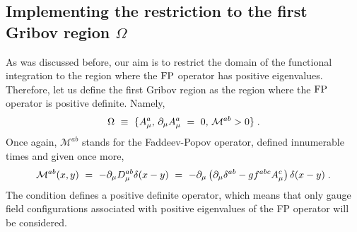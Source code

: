 \subsection{Implementing the restriction to the first Gribov region $\Omega$}
\label{Gribovimplementation}
As was discussed before, our aim is to restrict the domain of the functional integration to the region where the $\mathrm{FP}$ operator has positive eigenvalues. Therefore, let us define the first Gribov region as the region where the $\mathrm{FP}$ operator is positive definite. Namely,
\begin{eqnarray}
\Omega ~\equiv ~ \{ A^a_{\mu}, \, \partial_{\mu} A^a_{\mu} ~=~  0, \, \mathcal{M}^{ab}  >0  \} \;.
\label{defgribovregion}
\end{eqnarray}
Once again, $\mathcal{M}^{ab}$ stands for the Faddeev-Popov operator, defined innumerable times
and given once more,
\begin{eqnarray}\label{mab2}
\mathcal M^{ab}(x,y) ~=~ - \partial_\mu  D_\mu^{ab} \delta(x-y)  ~=~ 
-\partial_\mu \left( \partial_\mu \delta^{ab} -
gf^{abc} A_\mu^c \right) \delta(x-y)\;.
\end{eqnarray}
The condition defines a positive definite operator, which means that only gauge field
configurations associated with positive eigenvalues of the FP operator will be considered.

